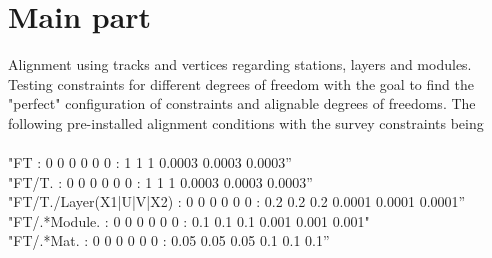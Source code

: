 \chapter{Main part}
\label{sec:story}




Alignment using tracks and vertices regarding stations, layers and modules. Testing constraints for different degrees of freedom with the goal to find the "perfect" configuration of constraints and alignable degrees of freedoms.
The following pre-installed alignment conditions with the survey constraints being\\
\\
"FT : 0 0 0 0 0 0 : 1 1 1 0.0003 0.0003 0.0003”\\
"FT/T. : 0 0 0 0 0 0 : 1 1 1 0.0003 0.0003 0.0003”\\
"FT/T./Layer(X1|U|V|X2) : 0 0 0 0 0 0 : 0.2 0.2 0.2 0.0001 0.0001 0.0001”\\
"FT/.*Module. : 0 0 0 0 0 0 : 0.1 0.1 0.1 0.001 0.001 0.001"\\
"FT/.*Mat. : 0 0 0 0 0 0 : 0.05 0.05 0.05 0.1 0.1 0.1”\\

